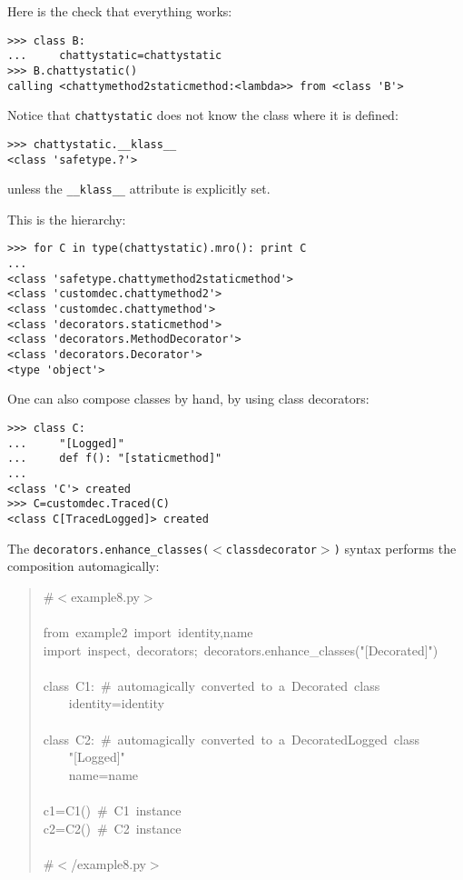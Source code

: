 \documentclass[11pt,english]{article}
\begin{document}
Here is the check that everything works:
\begin{verbatim}>>> class B: 
...     chattystatic=chattystatic
>>> B.chattystatic()
calling <chattymethod2staticmethod:<lambda>> from <class 'B'>\end{verbatim}

Notice that \texttt{chattystatic} does not know the class where it 
is defined:
\begin{verbatim}>>> chattystatic.__klass__
<class 'safetype.?'>\end{verbatim}

unless the \texttt{{\_}{\_}klass{\_}{\_}} attribute is explicitly set.

This is the hierarchy:
\begin{verbatim}>>> for C in type(chattystatic).mro(): print C
...
<class 'safetype.chattymethod2staticmethod'>
<class 'customdec.chattymethod2'>
<class 'customdec.chattymethod'>
<class 'decorators.staticmethod'>
<class 'decorators.MethodDecorator'>
<class 'decorators.Decorator'>
<type 'object'>\end{verbatim}

One can also compose classes by hand, by using class decorators:
\begin{verbatim}>>> class C: 
...     "[Logged]"
...     def f(): "[staticmethod]"
...
<class 'C'> created
>>> C=customdec.Traced(C)
<class C[TracedLogged]> created\end{verbatim}

The \texttt{decorators.enhance{\_}classes({$<$}classdecorator{$>$})} syntax performs
the composition automagically:
\begin{quote}
\begin{ttfamily}\begin{flushleft}
\mbox{{\#}{$<$}example8.py{$>$}}\\
\mbox{}\\
\mbox{from~example2~import~identity,name}\\
\mbox{import~inspect,~decorators;~decorators.enhance{\_}classes("[Decorated]")}\\
\mbox{}\\
\mbox{class~C1:~{\#}~automagically~converted~to~a~Decorated~class}\\
\mbox{~~~~identity=identity~}\\
\mbox{}\\
\mbox{class~C2:~{\#}~automagically~converted~to~a~DecoratedLogged~class}\\
\mbox{~~~~"[Logged]"}\\
\mbox{~~~~name=name}\\
\mbox{}\\
\mbox{c1=C1()~{\#}~C1~instance}\\
\mbox{c2=C2()~{\#}~C2~instance}\\
\mbox{}\\
\mbox{{\#}{$<$}/example8.py{$>$}}
\end{flushleft}\end{ttfamily}
\end{quote}
\end{document}
